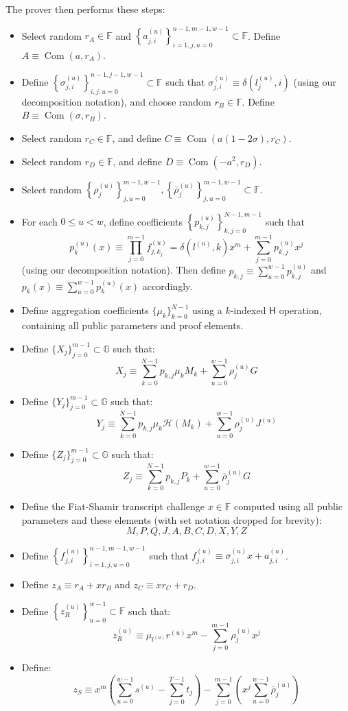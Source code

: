\documentclass[draft]{article}
\newcommand{\G}{\mathbb{G}}
\newcommand{\F}{\mathbb{F}}
\newcommand{\hs}{\mathsf{H}}
\newcommand{\hp}{\mathcal{H}}
\newcommand{\com}{\operatorname{Com}}
\newcommand{\sumj}{\sum_{j=0}^{m-1}}
\newcommand{\sumk}{\sum_{k=0}^{N-1}}
\newcommand{\sumu}{\sum_{u=0}^{w-1}}
\begin{document}
The prover then performs these steps:
\begin{itemize}
\item Select random $r_A \in \F$ and $\left\{a^{(u)}_{j,i}\right\}_{i=1,j,u=0}^{n-1,m-1,w-1} \subset \F$.
Define $A \equiv \com(a,r_A)$.
\item Define $\left\{\sigma^{(u)}_{j,i}\right\}_{i,j,u=0}^{n-1,j-1,w-1} \subset \F$ such that $\sigma^{(u)}_{j,i} \equiv \delta\left(l^{(u)}_j,i\right)$ (using our decomposition notation), and choose random $r_B \in \F$.
Define $B \equiv \com(\sigma,r_B)$.
\item Select random $r_C \in \F$, and define $C \equiv \com(a(1-2\sigma), r_C)$.
\item Select random $r_D \in \F$, and define $D \equiv \com(-a^2, r_D)$.
\item Select random $\left\{\rho^{(u)}_j\right\}_{j,u=0}^{m-1,w-1}, \left\{\overline{\rho}^{(u)}_j\right\}_{j,u=0}^{m-1,w-1} \subset \F$.
\item For each $0 \leq u < w$, define coefficients $\left\{p^{(u)}_{k,j}\right\}_{k,j=0}^{N-1,m-1}$ such that $$p^{(u)}_k(x) \equiv \prod_{j=0}^{m-1} f^{(u)}_{j,k_j} = \delta\left(l^{(u)},k\right)x^m + \sumj p^{(u)}_{k,j}x^j$$ (using our decomposition notation).
Then define $p_{k,j} \equiv \sumu p^{(u)}_{k,j}$ and $p_k(x) \equiv \sumu p^{(u)}_k(x)$ accordingly.
\item Define aggregation coefficients $\{\mu_k\}_{k=0}^{N-1}$ using a $k$-indexed $\hs$ operation, containing all public parameters and proof elements.
\item Define $\{X_j\}_{j=0}^{m-1} \subset \G$ such that: $$X_j \equiv \sumk p_{k,j}\mu_kM_k + \sumu \rho^{(u)}_jG$$
\item Define $\{Y_j\}_{j=0}^{m-1} \subset \G$ such that: $$Y_j \equiv \sumk p_{k,j}\mu_k\hp(M_k) + \sumu \rho^{(u)}_jJ^{(u)}$$
\item Define $\{Z_j\}_{j=0}^{m-1} \subset \G$ such that: $$Z_j \equiv \sumk p_{k,j}P_k + \sumu \overline{\rho}^{(u)}_jG$$
\item Define the Fiat-Shamir transcript challenge $x \in \F$ computed using all public parameters and these elements (with set notation dropped for brevity): $$M,P,Q,J,A,B,C,D,X,Y,Z$$
\item Define $\left\{f^{(u)}_{j,i}\right\}_{i=1,j,u=0}^{n-1,m-1,w-1}$ such that $f^{(u)}_{j,i} \equiv \sigma^{(u)}_{j,i}x + a^{(u)}_{j,i}$.
\item Define $z_A \equiv r_A + xr_B$ and $z_C \equiv xr_C + r_D$.
\item Define $\left\{z^{(u)}_R\right\}_{u=0}^{w-1} \subset \F$ such that: $$z^{(u)}_R \equiv \mu_{l^{(u)}}r^{(u)}x^m - \sumj \rho^{(u)}_jx^j$$
\item Define: $$z_S \equiv x^m\left( \sumu s^{(u)} - \sum_{j=0}^{T-1} t_j \right) - \sumj \left(x^j \sumu \overline{\rho}^{(u)}_j\right)$$
\end{itemize}
\end{document}
